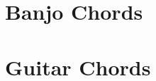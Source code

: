 \documentclass[leqno]{memoir}
\begin{document}
%
%
%
%
%
%

\chapter{Banjo Chords}

\newpage
\chapter{Guitar Chords}

\end{document}
